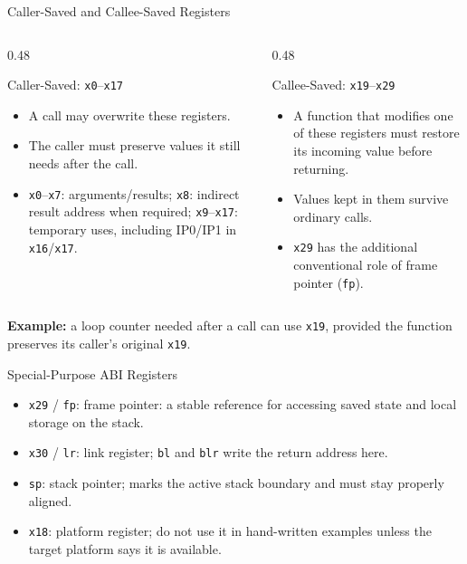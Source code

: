 \documentclass[aspectratio=169,11pt,t]{beamer}
\newcommand{\key}[1]{\textbf{#1}}
\newcommand{\bits}[1]{\texttt{#1}}
\newcommand{\code}[1]{\texttt{#1}}
\begin{document}
\begin{frame}{Caller-Saved and Callee-Saved Registers}
\begin{columns}[T,onlytextwidth]
\begin{column}{0.48\textwidth}
\begin{block}{Caller-Saved: \bits{x0}--\bits{x17}}
\begin{itemize}\setlength{\itemsep}{6pt}
\item A call may overwrite these registers.
\item The caller must preserve values it still needs after the call.
\item \bits{x0}--\bits{x7}: arguments/results; \bits{x8}: indirect result address when required; \bits{x9}--\bits{x17}: temporary uses, including IP0/IP1 in \bits{x16}/\bits{x17}.
\end{itemize}
\end{block}
\end{column}
\begin{column}{0.48\textwidth}
\begin{block}{Callee-Saved: \bits{x19}--\bits{x29}}
\begin{itemize}\setlength{\itemsep}{6pt}
\item A function that modifies one of these registers must restore its incoming value before returning.
\item Values kept in them survive ordinary calls.
\item \bits{x29} has the additional conventional role of frame pointer (\bits{fp}).
\end{itemize}
\end{block}
\end{column}
\end{columns}
\vspace{0.18cm}
\key{Example:} a loop counter needed after a call can use \bits{x19}, provided the function preserves its caller's original \bits{x19}.
\end{frame}


\begin{frame}{Special-Purpose ABI Registers}

\begin{itemize}\setlength{\itemsep}{7pt}
  \item \bits{x29} / \bits{fp}: frame pointer: a stable reference for accessing saved state and local storage on the stack.
  \item \bits{x30} / \bits{lr}: link register; \code{bl} and \code{blr} write the return address here.
  \item \bits{sp}: stack pointer; marks the active stack boundary and must stay properly aligned.
  \item \bits{x18}: platform register; do not use it in hand-written examples unless the target platform says it is available.
\end{itemize}


\end{frame}
\end{document}
